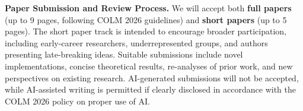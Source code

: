 \begin{table}
\vspace{-3mm}
\renewcommand{\arraystretch}{1.5}
\scriptsize
\centering
{}
\label{workshop_program}
\vspace{-1mm}
\caption{Tentative Schedule.}
\vspace{-10mm}
\end{table}

\noindent\textbf{Paper Submission and Review Process.}  
We will accept both \textbf{full papers} (up to 9 pages, following COLM 2026 guidelines) and \textbf{short papers} (up to 5 pages). The short paper track is intended to encourage broader participation, including early-career researchers, underrepresented groups, and authors presenting late-breaking ideas. Suitable submissions include novel implementations, concise theoretical results, re-analyses of prior work, and new perspectives on existing research. AI-generated submissions will not be accepted, while AI-assisted writing is permitted if clearly disclosed in accordance with the COLM 2026 policy on proper use of AI.

